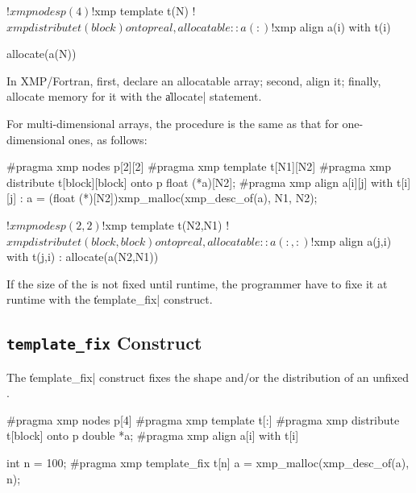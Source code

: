 \begin{XFexample}
!$xmp nodes p(4)
!$xmp template t(N)
!$xmp distribute t(block) onto p
real, allocatable :: a(:)
!$xmp align a(i) with t(i)

allocate(a(N))
\end{XFexample}

In XMP/Fortran, first, declare an allocatable array; second, align it;
finally, allocate memory for it with the \|allocate| statement.


For multi-dimensional arrays, the procedure is the same as that for 
one-dimensional ones, as follows:

\begin{XCexample}
#pragma xmp nodes p[2][2]
#pragma xmp template t[N1][N2]
#pragma xmp distribute t[block][block] onto p
float (*a)[N2];
#pragma xmp align a[i][j] with t[i][j]
  :
a = (float (*)[N2])xmp_malloc(xmp_desc_of(a), N1, N2);
\end{XCexample}

\begin{XFexample}
!$xmp nodes p(2,2)
!$xmp template t(N2,N1)
!$xmp distribute t(block,block) onto p
real, allocatable :: a(:,:)
!$xmp align a(j,i) with t(j,i)
  :
allocate(a(N2,N1))
\end{XFexample}

\begin{mynote}
  If the size of the {\template} is not fixed until runtime, the programmer
  have to fixe it at runtime with the \|template_fix| construct.
\end{mynote}


\subsection{{\tt template\_fix} Construct}
\label{184243_1Nov19}

The \|template_fix| construct fixes the shape and/or the distribution of
an unfixed {\template}. 

\begin{XCexample}
#pragma xmp nodes p[4]
#pragma xmp template t[:]
#pragma xmp distribute t[block] onto p
double *a;
#pragma xmp align a[i] with t[i]

int n = 100;
#pragma xmp template_fix t[n]
a = xmp_malloc(xmp_desc_of(a), n);
\end{XCexample}

